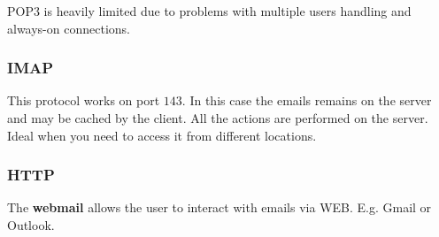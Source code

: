 \begin{note}
	POP3 is heavily limited due to problems with multiple users handling and always-on connections.
\end{note}
\subsubsection{IMAP}
This protocol works on port $143$. In this case the emails remains on the server and may be cached by the client. All the actions are performed on the server. Ideal when you need to access it from different locations.

\subsubsection{HTTP}
The \textbf{webmail} allows the user to interact with emails via WEB. E.g. Gmail or Outlook.